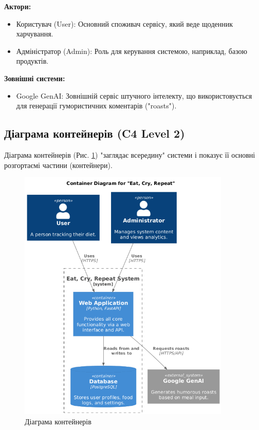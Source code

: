 \documentclass[12pt, a4paper]{article}
\begin{document}
\textbf{Актори:}
\begin{itemize}
    \item Користувач (User): Основний споживач сервісу, який веде щоденник
        харчування.

    \item Адміністратор (Admin): Роль для керування системою, наприклад, базою
        продуктів.
\end{itemize}

\textbf{Зовнішні системи:}
\begin{itemize}
    \item Google GenAI: Зовнішній сервіс штучного інтелекту, що
        використовується для генерації гумористичних коментарів ("roasts").
\end{itemize}

\subsection{Діаграма контейнерів (C4 Level 2)}

Діаграма контейнерів (Рис. \ref{fig:c4_container}) "заглядає всередину" системи
і показує її основні розгортаємі частини (контейнери).

\begin{figure}[h!]
    \centering
    \includegraphics[width=0.9\textwidth]{c4_container.png}
    \caption{Діаграма контейнерів}
    \label{fig:c4_container}
\end{figure}
\end{document}
